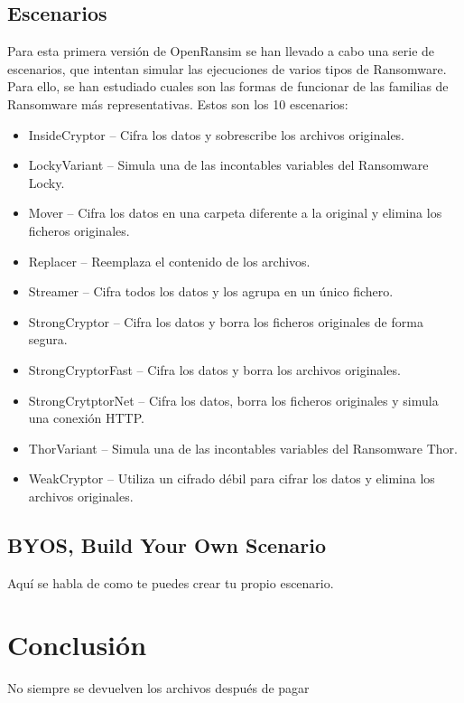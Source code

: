 \documentclass[a4paper,12pt]{article}
\begin{document}
\subsection{Escenarios}
Para esta primera versión de OpenRansim se han llevado a cabo una serie de escenarios, que intentan simular las ejecuciones de varios tipos de Ransomware. Para ello, se han estudiado cuales son las formas de funcionar de las familias de Ransomware más representativas. Estos son los 10 escenarios: 
\begin{itemize}
\item InsideCryptor – Cifra los datos y sobrescribe los archivos originales.
\item LockyVariant – Simula una de las incontables variables del Ransomware Locky.
\item Mover – Cifra los datos en una carpeta diferente a la original y elimina los ficheros originales.
\item Replacer – Reemplaza el contenido de los archivos.
\item Streamer – Cifra todos los datos y los agrupa en un único fichero.
\item StrongCryptor – Cifra los datos y borra los ficheros originales de forma segura.
\item StrongCryptorFast – Cifra los datos y borra los archivos originales.
\item StrongCrytptorNet – Cifra los datos, borra los ficheros originales y simula una conexión HTTP.
\item ThorVariant – Simula una de las incontables variables del Ransomware Thor.
\item WeakCryptor – Utiliza un cifrado débil para cifrar los datos y elimina los archivos originales.
\end{itemize}
\subsection{BYOS, Build Your Own Scenario}
Aquí se habla de como te puedes crear tu propio escenario.
\section{Conclusión}
No siempre se devuelven los archivos después de pagar
\end{document}
